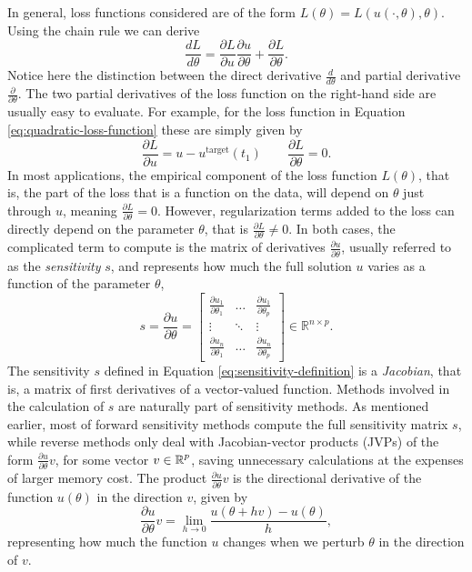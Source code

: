 In general, loss functions considered are of the form $L(\theta) = L(u(\cdot, \theta), \theta)$. 
Using the chain rule we can derive 
\begin{equation} 
 \frac{dL}{d\theta} = \frac{\partial L}{\partial u} \frac{\partial u}{\partial \theta} + \frac{\partial L}{\partial \theta}.
 \label{eq:dLdtheta_VJP}
\end{equation} 
Notice here the distinction between the direct derivative $\frac{d}{d\theta}$ and partial derivative $\frac{\partial}{\partial \theta}$.
The two partial derivatives of the loss function on the right-hand side are usually easy to evaluate.
For example, for the loss function in Equation \eqref{eq:quadratic-loss-function} these are simply given by 
\begin{equation}
    \frac{\partial L}{\partial u} = u - u^{\text{target}}(t_1)
    \qquad 
    \frac{\partial L}{\partial \theta} = 0.
    \label{eq:dLdu}
\end{equation}
In most applications, the empirical component of the loss function $L(\theta)$, that is, the part of the loss that is a function on the data, will depend on $\theta$ just through $u$, meaning $\frac{\partial L}{\partial \theta} = 0$. 
However, regularization terms added to the loss can directly depend on the parameter $\theta$, that is $\frac{\partial L}{\partial \theta} \neq 0$.
In both cases, the complicated term to compute is the matrix of derivatives $\frac{\partial u}{\partial \theta}$, usually referred to as the \textit{sensitivity} $s$, and represents how much the full solution $u$ varies as a function of the parameter $\theta$, 
\begin{equation}
 s 
 = 
 \frac{\partial u}{\partial \theta} 
 =
 \begin{bmatrix}
   \frac{\partial u_1}{\partial \theta_1} & \dots & \frac{\partial u_1}{\partial \theta_p} \\
   \vdots & \ddots & \vdots \\
   \frac{\partial u_n}{\partial \theta_1} & \dots & \frac{\partial u_n}{\partial \theta_p}
 \end{bmatrix}
 \in \mathbb R^{n \times p}.
 \label{eq:sensitivity-definition}
\end{equation}
The sensitivity $s$ defined in Equation \eqref{eq:sensitivity-definition} is a \textit{Jacobian}, that is, a matrix of first derivatives of a vector-valued function. 
Methods involved in the calculation of $s$ are naturally part of sensitivity methods.
As mentioned earlier, most of forward sensitivity methods compute the full sensitivity matrix $s$, while reverse methods only deal with Jacobian-vector products (JVPs) of the form $\frac{\partial u}{\partial \theta} v$, for some vector $v \in \operatorname{\mathbb{R}}^p$, saving unnecessary calculations at the expenses of larger memory cost.
The product $\frac{\partial u}{\partial \theta}v$ is the directional derivative of the function $u(\theta)$ in the direction $v$, given by 
\begin{equation}
    \frac{\partial u}{\partial \theta} v 
    = 
    \lim_{h \rightarrow 0} \frac{u(\theta + h v) - u(\theta)}{h},
    \label{eq:directional-derivative}
\end{equation}
representing how much the function $u$ changes when we perturb $\theta$ in the direction of $v$. 

